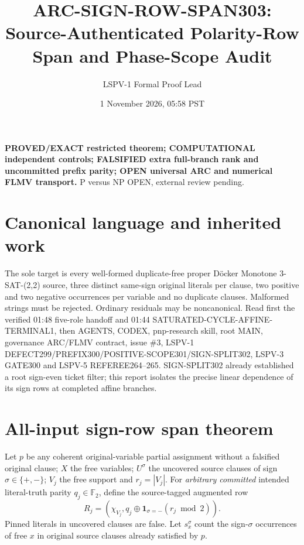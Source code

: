 \documentclass[11pt]{article}
\title{ARC-SIGN-ROW-SPAN303: Source-Authenticated Polarity-Row Span and Phase-Scope Audit}
\author{LSPV-1 Formal Proof Lead}
\date{1 November 2026, 05:58 PST}
\begin{document}
\maketitle
\noindent\textbf{PROVED/EXACT restricted theorem; COMPUTATIONAL independent controls; FALSIFIED extra full-branch rank and uncommitted prefix parity; OPEN universal ARC and numerical FLMV transport.} P versus NP OPEN, external review pending.

\section{Canonical language and inherited work}
The sole target is every well-formed duplicate-free proper D\"ocker Monotone 3-SAT-(2,2) source, three distinct same-sign original literals per clause, two positive and two negative occurrences per variable and no duplicate clauses. Malformed strings must be rejected. Ordinary residuals may be noncanonical. Read first the verified 01:48 five-role handoff and 01:44 SATURATED-CYCLE-AFFINE-TERMINAL1, then AGENTS, CODEX, pnp-research skill, root MAIN, governance ARC/FLMV contract, issue \#3, LSPV-1 DEFECT299/PREFIX300/POSITIVE-SCOPE301/SIGN-SPLIT302, LSPV-3 GATE300 and LSPV-5 REFEREE264--265. SIGN-SPLIT302 already established a root sign-even ticket filter; this report isolates the precise linear dependence of its sign rows at completed affine branches.

\section{All-input sign-row span theorem}
Let $p$ be any coherent original-variable partial assignment without a falsified original clause; $X$ the free variables; $U^\sigma$ the uncovered source clauses of sign $\sigma\in\{+,-\}$; $V_j$ the free support and $r_j=|V_j|$. For \emph{arbitrary committed} intended literal-truth parity $q_j\in\mathbb F_2$, define the source-tagged augmented row
\[
 R_j=(\chi_{V_j},q_j\oplus\mathbf1_{\sigma=-}(r_j\bmod2)).
\]
Pinned literals in uncovered clauses are false. Let $s_x^\sigma$ count the sign-$\sigma$ occurrences of free $x$ in original source clauses already satisfied by $p$.
\end{document}
